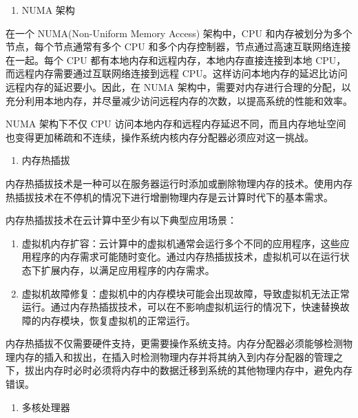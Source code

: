 \documentclass[AutoFakeBold]{LZUThesis}
\newcommand{\tightlist}{%
  \setlength{\itemsep}{0pt}\setlength{\parskip}{0pt}}
\begin{document}
\begin{sloppypar}
\begin{enumerate}
\def\labelenumi{\arabic{enumi}.}
\tightlist
\item
  NUMA 架构
\end{enumerate}

在一个 NUMA(Non-Uniform Memory Access) 架构中，CPU 和内存被划分为多个节点，每个节点通常有多个 CPU
和多个内存控制器，节点通过高速互联网络连接在一起。每个 CPU
都有本地内存和远程内存，本地内存直接连接到本地
CPU，而远程内存需要通过互联网络连接到远程
CPU。这样访问本地内存的延迟比访问远程内存的延迟要小。因此，在 NUMA
架构中，需要对内存进行合理的分配，以充分利用本地内存，并尽量减少访问远程内存的次数，以提高系统的性能和效率。

NUMA 架构下不仅 CPU
访问本地内存和远程内存延迟不同，而且内存地址空间也变得更加稀疏和不连续，操作系统内核内存分配器必须应对这一挑战。

\begin{enumerate}
\def\labelenumi{\arabic{enumi}.}
\setcounter{enumi}{1}
\tightlist
\item
  内存热插拔
\end{enumerate}

内存热插拔技术是一种可以在服务器运行时添加或删除物理内存的技术。使用内存热插拔技术在不停机的情况下进行增删物理内存是云计算时代下的基本需求。

内存热插拔技术在云计算中至少有以下典型应用场景：

\begin{enumerate}
\def\labelenumi{\arabic{enumi}.}
\item
  虚拟机内存扩容：云计算中的虚拟机通常会运行多个不同的应用程序，这些应用程序的内存需求可能随时变化。通过内存热插拔技术，虚拟机可以在运行状态下扩展内存，以满足应用程序的内存需求。
\item
  虚拟机故障修复：虚拟机中的内存模块可能会出现故障，导致虚拟机无法正常运行。通过内存热插拔技术，可以在不影响虚拟机运行的情况下，快速替换故障的内存模块，恢复虚拟机的正常运行。
\end{enumerate}

内存热插拔不仅需要硬件支持，更需要操作系统支持。内存分配器必须能够检测物理内存的插入和拔出，在插入时检测物理内存并将其纳入到内存分配器的管理之下，拔出内存时必时必须将内存中的数据迁移到系统的其他物理内存中，避免内存错误。

\begin{enumerate}
\def\labelenumi{\arabic{enumi}.}
\setcounter{enumi}{2}
\tightlist
\item
  多核处理器
\end{enumerate}


\end{sloppypar}
\end{document}

